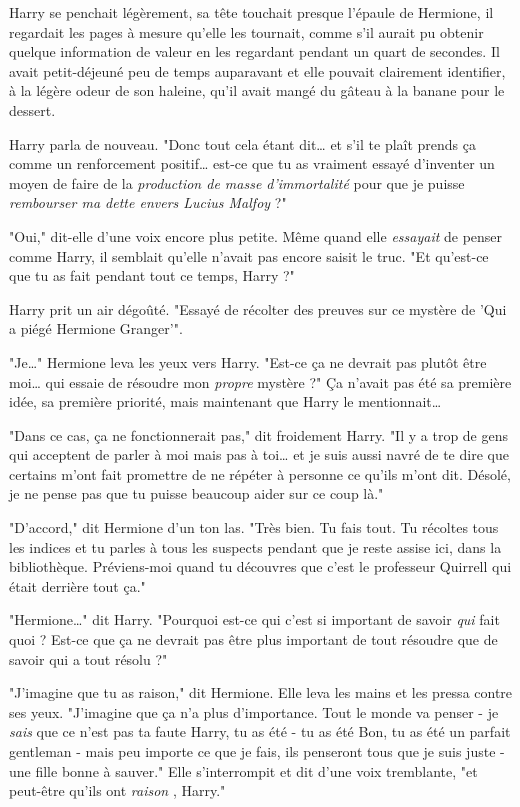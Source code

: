 Harry se penchait légèrement, sa tête touchait presque l'épaule de Hermione, il regardait les pages à mesure qu'elle les tournait, comme s'il aurait pu obtenir quelque information de valeur en les regardant pendant un quart de secondes. Il avait petit-déjeuné peu de temps auparavant et elle pouvait clairement identifier, à la légère odeur de son haleine, qu'il avait mangé du gâteau à la banane pour le dessert.

Harry parla de nouveau. "Donc tout cela étant dit… et s'il te plaît prends ça comme un renforcement positif… est-ce que tu as vraiment essayé d'inventer un moyen de faire de la \emph{production de masse d'immortalité}  pour que je puisse \emph{rembourser ma dette envers Lucius Malfoy}  ?"

"Oui," dit-elle d'une voix encore plus petite. Même quand elle \emph{essayait}  de penser comme Harry, il semblait qu'elle n'avait pas encore saisit le truc. "Et qu'est-ce que tu as fait pendant tout ce temps, Harry ?"

Harry prit un air dégoûté. "Essayé de récolter des preuves sur ce mystère de 'Qui a piégé Hermione Granger'".

"Je…" Hermione leva les yeux vers Harry. "Est-ce ça ne devrait pas plutôt être moi… qui essaie de résoudre mon \emph{propre}  mystère ?" Ça n'avait pas été sa première idée, sa première priorité, mais maintenant que Harry le mentionnait…

"Dans ce cas, ça ne fonctionnerait pas," dit froidement Harry. "Il y a trop de gens qui acceptent de parler à moi mais pas à toi… et je suis aussi navré de te dire que certains m'ont fait promettre de ne répéter à personne ce qu'ils m'ont dit. Désolé, je ne pense pas que tu puisse beaucoup aider sur ce coup là."

"D'accord," dit Hermione d'un ton las. "Très bien. Tu fais tout. Tu récoltes tous les indices et tu parles à tous les suspects pendant que je reste assise ici, dans la bibliothèque. Préviens-moi quand tu découvres que c'est le professeur Quirrell qui était derrière tout ça."

"Hermione…" dit Harry. "Pourquoi est-ce qui c'est si important de savoir \emph{qui}  fait quoi ? Est-ce que ça ne devrait pas être plus important de tout résoudre que de savoir qui a tout résolu ?"

"J'imagine que tu as raison," dit Hermione. Elle leva les mains et les pressa contre ses yeux. "J'imagine que ça n'a plus d'importance. Tout le monde va penser - je \emph{sais}  que ce n'est pas ta faute Harry, tu as été - tu as été Bon, tu as été un parfait gentleman - mais peu importe ce que je fais, ils penseront tous que je suis juste - une fille bonne à sauver." Elle s'interrompit et dit d'une voix tremblante, "et peut-être qu'ils ont \emph{raison} , Harry."

